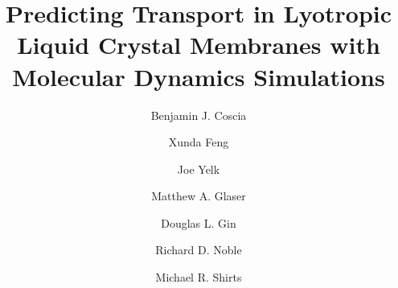 \documentclass{article}
\title{Predicting Transport in Lyotropic Liquid Crystal Membranes with Molecular Dynamics Simulations}
\author{Benjamin J. Coscia \and Xunda Feng \and Joe Yelk \and Matthew A. Glaser \and Douglas L. Gin \and Richard D. Noble \and Michael R. Shirts}
\begin{document}

\graphicspath{{./figures/}}  %
\maketitle







\newpage

\end{document}
